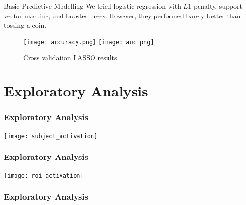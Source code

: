 \documentclass{beamer}
\begin{document}
\begin{frame}{Basic Predictive Modelling}
We tried logistic regression with $L1$ penalty, support vector machine, and boosted trees. However, they performed barely better than tossing a coin. 
\begin{figure}[H]
\texttt{[image: accuracy.png]}
\texttt{[image: auc.png]}
\caption{Cross validation LASSO results}
\end{figure}
\end{frame}


\section{Exploratory Analysis}
\begin{frame}
\frametitle{Exploratory Analysis}
\begin{center}
\texttt{[image: subject\_activation]}
\end{center}
\end{frame}

\begin{frame}
\frametitle{Exploratory Analysis}
\begin{center}
\texttt{[image: roi\_activation]}
\end{center}
\end{frame}

\begin{frame}
\frametitle{Exploratory Analysis}
\begin{overprint}
\end{overprint}
\end{frame}
\end{document}
